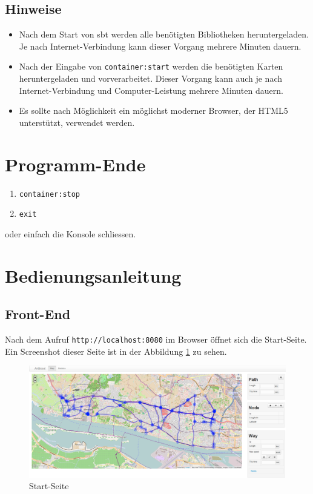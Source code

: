 \subsection{Hinweise}
\label{sec:programmstart-hinweise}

\begin{itemize}
  \item Nach dem Start von \gls{sbt} werden alle benötigten Bibliotheken heruntergeladen.
    Je nach Internet-Verbindung kann dieser Vorgang mehrere Minuten dauern.
  \item Nach der Eingabe von \texttt{container:start} werden die benötigten Karten heruntergeladen und vorverarbeitet.
    Dieser Vorgang kann auch je nach Internet-Verbindung und Computer-Leistung mehrere Minuten dauern.
  \item Es sollte nach Möglichkeit ein möglichst moderner Browser, der HTML5 unterstützt, verwendet werden.
\end{itemize}

\section{Programm-Ende}
\label{sec:programm-ende}

\begin{enumerate}
  \item \texttt{container:stop}
  \item \texttt{exit}
\end{enumerate}

oder einfach die Konsole schliessen.

\section{Bedienungsanleitung}
\label{sec:bedienungsanleitung}

\subsection{Front-End}
\label{sec:front-end}

Nach dem Aufruf \texttt{http://localhost:8080} im Browser öffnet sich die Start-Seite.
Ein Screenshot dieser Seite ist in der Abbildung \ref{fig:start-seite} zu sehen.

\begin{figure}[htbp]
  \centering
  \includegraphics[width=\textwidth]{Bilder/Start-Seite.png}
  \caption{Start-Seite}
  \label{fig:start-seite}
\end{figure}

